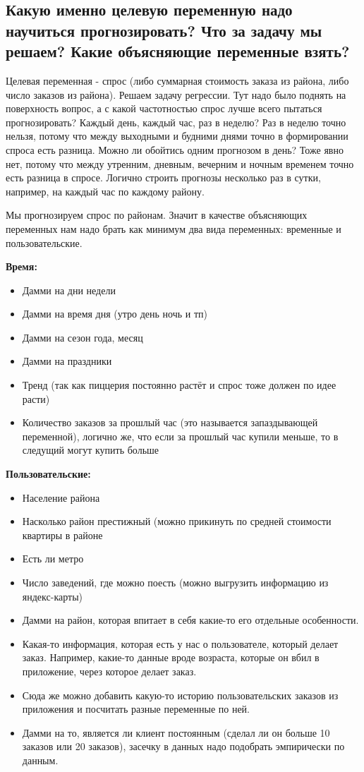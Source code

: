 \documentclass[12pt, a4paper, oneside]{article}
\begin{document}
\subsection*{Какую именно целевую переменную надо научиться прогнозировать? Что за задачу мы решаем? Какие объясняющие переменные взять?}

Целевая переменная - спрос (либо суммарная стоимость заказа из района, либо число заказов из района). Решаем задачу регрессии. Тут надо было поднять на поверхность вопрос,  а с какой частотностью спрос лучше всего пытаться прогнозировать? Каждый день, каждый час, раз в неделю? Раз в неделю точно нельзя, потому что между выходными и будними днями точно в формировании спроса есть разница.  Можно ли обойтись одним прогнозом в день? Тоже явно нет, потому что между утренним, дневным, вечерним и ночным временем точно есть разница в спросе.  Логично строить прогнозы несколько раз в сутки, например, на каждый час по каждому району.

Мы прогнозируем спрос по районам. Значит в качестве объясняющих переменных нам надо брать как минимум два вида переменных: временные и пользовательские. 

\textbf{Время: }
\begin{itemize}
\item Дамми на дни недели
\item Дамми на время дня (утро день ночь и тп) 
\item Дамми на сезон года, месяц 
\item Дамми на праздники 
\item Тренд (так как пиццерия постоянно растёт и спрос тоже должен по идее расти) 
\item Количество заказов за прошлый час (это называется запаздывающей переменной), логично же, что если за прошлый час купили меньше, то в следущий могут купить больше 
\end{itemize}

\textbf{Пользовательские:}

\begin{itemize}
\item Население района
\item Насколько район престижный (можно прикинуть по средней стоимости квартиры в районе 
\item Есть ли метро
\item Число заведений, где можно поесть (можно выгрузить информацию из яндекс-карты) 
\item Дамми на район, которая впитает в себя какие-то его отдельные особенности. 
\item Какая-то информация, которая есть у нас о пользователе, который делает заказ. Например, какие-то данные вроде возраста, которые он вбил в приложение, через которое делает заказ. 
\item Сюда же можно добавить какую-то историю пользовательских заказов из приложения и посчитать разные переменные по ней. 
\item Дамми на то, является ли клиент постоянным (сделал ли он больше 10 заказов или 20 заказов), засечку в данных надо подобрать эмпирически по данным.
\end{itemize}
\end{document}
